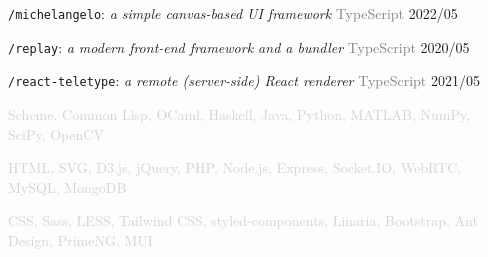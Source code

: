 \documentclass[10pt]{article}
\begin{document}
\vspace{0.5em}
\texttt{/michelangelo}: \textit{a simple canvas-based UI framework} \hfill \textcolor{gray}{TypeScript}  2022/05

\vspace{0.5em}
\texttt{/replay}: \textit{a modern front-end framework and a bundler} \hfill \textcolor{gray}{TypeScript} 2020/05

\vspace{0.5em}
\texttt{/react-teletype}: \textit{a remote (server-side) React renderer} \hfill \textcolor{gray}{TypeScript} 2021/05

\vspace{2em}

\textcolor{lightgray}{Scheme, Common Lisp, OCaml, Haskell, Java, Python, MATLAB, NumPy, SciPy, OpenCV}

\textcolor{lightgray}{HTML, SVG, D3.js, jQuery, PHP, Node.js, Express, Socket.IO, WebRTC, MySQL, MongoDB}

\textcolor{lightgray}{CSS, Sass, LESS, Tailwind CSS, styled-components, Linaria, Bootstrap, Ant Design, PrimeNG, MUI}
\end{document}
